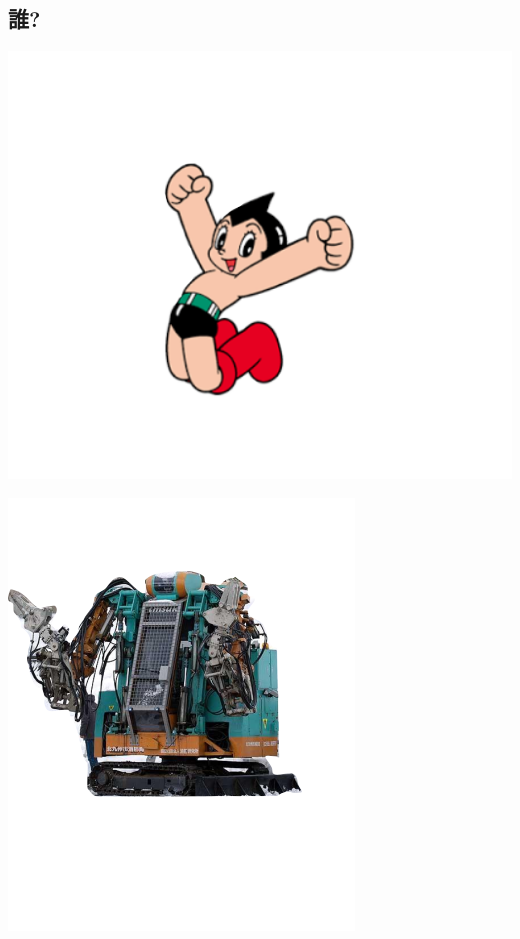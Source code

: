 \subsection{誰?}
\label{sec:orgheadline8}

\begin{container-fluid}
\begin{row-fluid}
\begin{span6}
\includegraphics{img/astro/1.png}
\end{span6}
\begin{span6}
\includegraphics{img/rescue/1.png}
\end{span6}
\end{row-fluid}
\begin{row-fluid}
\begin{span12}
\begin{xlarge}
　
\end{xlarge}
\end{span12}
\end{row-fluid}
\end{container-fluid}

